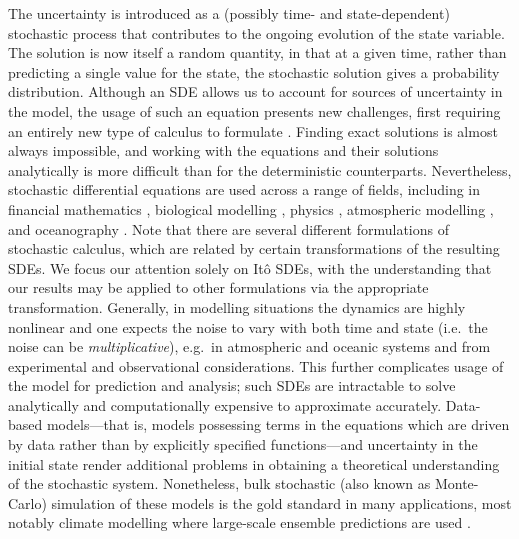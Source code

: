 The uncertainty is introduced as a (possibly time- and state-dependent) stochastic process that contributes to the ongoing evolution of the state variable.
The solution is now itself a random quantity, in that at a given time, rather than predicting a single value for the state, the stochastic solution gives a probability distribution.
Although an SDE allows us to account for sources of uncertainty in the model, the usage of such an equation presents new challenges, first requiring an entirely new type of calculus to formulate \citep{Ito_1944_StochasticIntegral,Ito_1946_StochasticIntegralEquation}.
Finding exact solutions is almost always impossible, and working with the equations and their solutions analytically is more difficult than for the deterministic counterparts.
Nevertheless, stochastic differential equations are used across a range of fields, including in financial mathematics \citep{KabanovEtAl_2006_StochasticCalculusMathematical}, biological modelling \citep[e.g.]{PreislerEtAl_2004_ModelingAnimalMovements,BacharEtAl_2013_StochasticBiomathematicalModels}, physics \citep[e.g.]{StraussEffenberger_2017_HitchhikerGuideStochastic,GardinerEtAl_1992_WavefunctionQuantumStochastic}, atmospheric modelling \citep{WilsonSawford_1996_ReviewLagrangianStochastic}, and oceanography \citep{BerloffMcWilliams_2002_MaterialTransportOceanic}.
Note that there are several different formulations of stochastic calculus, which are related by certain transformations of the resulting SDEs.
We focus our attention solely on It\^o SDEs, with the understanding that our results may be applied to other formulations via the appropriate transformation.
Generally, in modelling situations the dynamics are highly nonlinear and one expects the noise to vary with both time and state (i.e.\ the noise can be \emph{multiplicative}), e.g.\ in atmospheric \citep{SuraEtAl_2005_MultiplicativeNoiseNonGaussianity,Sura_2003_StochasticAnalysisSouthern} and oceanic \citep{KamenkovichEtAl_2015_PropertiesOriginsAnisotropic} systems and from experimental and observational considerations.
This further complicates usage of the model for prediction and analysis; such SDEs are intractable to solve analytically and computationally expensive to approximate accurately.
Data-based models---that is, models possessing terms in the equations which are driven by data rather than by explicitly specified functions---and uncertainty in the initial state render additional problems in obtaining a theoretical understanding of the stochastic system.
Nonetheless, bulk stochastic (also known as Monte-Carlo) simulation of these models is the gold standard in many applications, most notably climate modelling where large-scale ensemble predictions are used \citep{Collins_2007_EnsemblesProbabilitiesNew,LeutbecherEtAl_2017_StochasticRepresentationsModel}.

